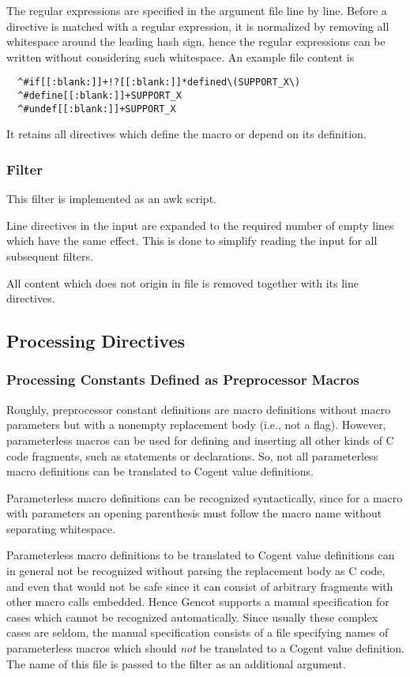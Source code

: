 The regular expressions are specified in the argument file line by line. Before a directive is matched with 
a regular expression, it is normalized by removing all whitespace around the leading hash sign, hence the
regular expressions can be written without considering such whitespace. An example file content is
\begin{verbatim}
  ^#if[[:blank:]]+!?[[:blank:]]*defined\(SUPPORT_X\)
  ^#define[[:blank:]]+SUPPORT_X
  ^#undef[[:blank:]]+SUPPORT_X
\end{verbatim}
It retains all directives which define the macro  or depend on its definition.

\subsubsection{Filter }

This filter is implemented as an awk script.

Line directives in the input are expanded to the required number of empty lines
which have the same effect. This is done to simplify reading the input for all subsequent filters.

All content which does not origin in file  is removed together with its line directives.

\subsection{Processing Directives}

\subsubsection{Processing Constants Defined as Preprocessor Macros}

Roughly, preprocessor constant definitions are macro definitions without macro parameters but with a 
nonempty replacement body (i.e., not a flag). However, parameterless macros can be used for defining
and inserting all other kinds of C code fragments, such as statements or declarations. So, not all
parameterless macro definitions can be translated to Cogent value definitions.

Parameterless macro definitions can be recognized syntactically, since for a macro with parameters 
an opening parenthesis must follow the macro name without separating whitespace. 

Parameterless macro definitions to be translated to Cogent value definitions can in general not be 
recognized without parsing the replacement body as C code, and even that would not be safe since 
it can consist of arbitrary fragments with other macro calls embedded. Hence Gencot supports a manual
specification for cases which cannot be recognized automatically. Since usually these complex cases
are seldom, the manual specification consists of a file specifying names of parameterless macros which
should \textit{not} be translated to a Cogent value definition. The name of this file is passed to the filter
 as an additional argument.

